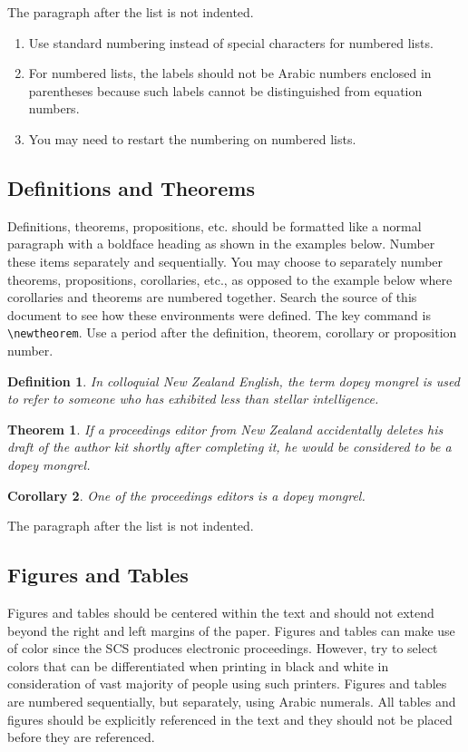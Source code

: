 \documentclass{scspaperproc}
\theoremstyle{scsthe}
\newtheorem{theorem}{Theorem}
\newtheorem{corollary}[theorem]{Corollary}
\newtheorem{definition}{Definition}
\begin{document}
The paragraph after the list is not indented.
\begin{enumerate}
	\item Use standard numbering instead of special characters for numbered lists.
	\item For numbered lists, the labels should not be Arabic numbers enclosed in parentheses because such labels cannot be distinguished from equation numbers.
	\item You may need to restart the numbering on numbered lists.
\end{enumerate}


\subsection{Definitions and Theorems}
Definitions, theorems, propositions, etc. should be formatted like a normal paragraph with a boldface heading as shown in the examples below. Number these items separately and sequentially. You may choose to separately number theorems, propositions, corollaries, etc., as opposed to the example below where corollaries and theorems are numbered together. Search the source of this document to see how these environments were defined. The key command is \verb+\newtheorem+. Use a period after the definition, theorem, corollary or proposition number.

\begin{definition}
In colloquial New Zealand English, the term \emph{dopey mongrel} is used to refer to someone who has exhibited less than stellar intelligence.
\end{definition}

\begin{theorem}
If a proceedings editor from New Zealand accidentally deletes his draft of the author kit shortly after completing it, he would be considered to be a dopey mongrel.
\end{theorem}

\begin{corollary}
One of the proceedings editors is a dopey mongrel.
\end{corollary}

The paragraph after the list is not indented.


\subsection{Figures and Tables}
\label{sec:graphics}
Figures and tables should be centered within the text and should not extend beyond the right and left margins of the paper. Figures and tables can make use of color since the SCS produces electronic proceedings. However, try to select colors that can be differentiated when printing in black and white in consideration of vast majority of people using such printers. Figures and tables are numbered sequentially, but separately, using Arabic numerals. All tables and figures should be explicitly referenced in the text and they should not be placed before they are referenced.
\end{document}

